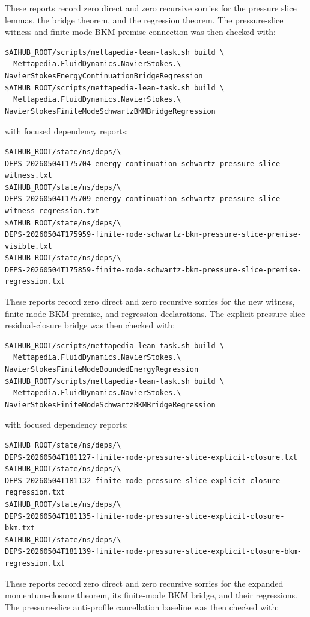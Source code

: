 \documentclass[11pt]{article}
\begin{document}
These reports record zero direct and zero recursive sorries for the pressure
slice lemmas, the bridge theorem, and the regression theorem.
The pressure-slice witness and finite-mode BKM-premise connection was then
checked with:
\begin{verbatim}
$AIHUB_ROOT/scripts/mettapedia-lean-task.sh build \
  Mettapedia.FluidDynamics.NavierStokes.\
NavierStokesEnergyContinuationBridgeRegression
$AIHUB_ROOT/scripts/mettapedia-lean-task.sh build \
  Mettapedia.FluidDynamics.NavierStokes.\
NavierStokesFiniteModeSchwartzBKMBridgeRegression
\end{verbatim}
with focused dependency reports:
\begin{verbatim}
$AIHUB_ROOT/state/ns/deps/\
DEPS-20260504T175704-energy-continuation-schwartz-pressure-slice-witness.txt
$AIHUB_ROOT/state/ns/deps/\
DEPS-20260504T175709-energy-continuation-schwartz-pressure-slice-witness-regression.txt
$AIHUB_ROOT/state/ns/deps/\
DEPS-20260504T175959-finite-mode-schwartz-bkm-pressure-slice-premise-visible.txt
$AIHUB_ROOT/state/ns/deps/\
DEPS-20260504T175859-finite-mode-schwartz-bkm-pressure-slice-premise-regression.txt
\end{verbatim}
These reports record zero direct and zero recursive sorries for the new witness,
finite-mode BKM-premise, and regression declarations.
The explicit pressure-slice residual-closure bridge was then checked with:
\begin{verbatim}
$AIHUB_ROOT/scripts/mettapedia-lean-task.sh build \
  Mettapedia.FluidDynamics.NavierStokes.\
NavierStokesFiniteModeBoundedEnergyRegression
$AIHUB_ROOT/scripts/mettapedia-lean-task.sh build \
  Mettapedia.FluidDynamics.NavierStokes.\
NavierStokesFiniteModeSchwartzBKMBridgeRegression
\end{verbatim}
with focused dependency reports:
\begin{verbatim}
$AIHUB_ROOT/state/ns/deps/\
DEPS-20260504T181127-finite-mode-pressure-slice-explicit-closure.txt
$AIHUB_ROOT/state/ns/deps/\
DEPS-20260504T181132-finite-mode-pressure-slice-explicit-closure-regression.txt
$AIHUB_ROOT/state/ns/deps/\
DEPS-20260504T181135-finite-mode-pressure-slice-explicit-closure-bkm.txt
$AIHUB_ROOT/state/ns/deps/\
DEPS-20260504T181139-finite-mode-pressure-slice-explicit-closure-bkm-regression.txt
\end{verbatim}
These reports record zero direct and zero recursive sorries for the expanded
momentum-closure theorem, its finite-mode BKM bridge, and their regressions.
The pressure-slice anti-profile cancellation baseline was then checked with:
\end{document}

